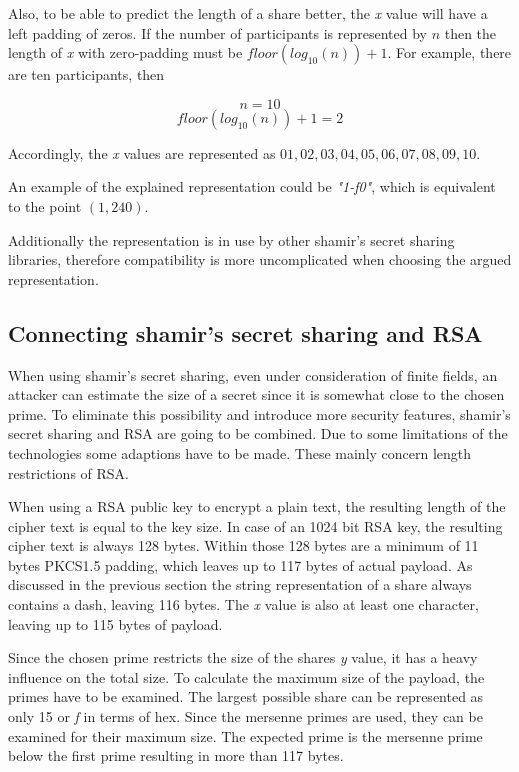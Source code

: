 Also, to be able to predict the length of a share better, the \textit{x} value
will have a left padding of zeros. If the number of participants is represented
by $n$ then the length of \textit{x} with zero-padding must be
$floor(log_{10}(n))+1$. For example, there are ten participants, then

$$n = 10$$
$$floor(log_{10}(n))+1 = 2$$

Accordingly, the \textit{x} values are represented as $01, 02, 03, 04, 05, 06,
07, 08, 09, 10$.

An example of the explained representation could be \textit{"1-f0"}, which is
equivalent to the point $(1, 240)$.

Additionally the representation is in use by other shamir's secret sharing
libraries, therefore compatibility is more uncomplicated when choosing the
argued representation.

\subsection{Connecting shamir's secret sharing and RSA}

When using shamir's secret sharing, even under consideration of finite fields,
an attacker can estimate the size of a secret since it is somewhat close to the
chosen prime. To eliminate this possibility and introduce more security
features, shamir's secret sharing and RSA are going to be combined. Due to some
limitations of the technologies some adaptions have to be made. These mainly
concern length restrictions of RSA.

When using a RSA public key to encrypt a plain text, the resulting length of
the cipher text is equal to the key size. In case of an 1024 bit RSA key, the
resulting cipher text is always 128 bytes. Within those 128 bytes are a minimum
of 11 bytes PKCS1.5 padding, which leaves up to 117 bytes of actual payload. As
discussed in the previous section the string representation of a share always
contains a dash, leaving 116 bytes. The \textit{x} value is also at least one
character, leaving up to 115 bytes of payload.

Since the chosen prime restricts the size of the shares \textit{y} value, it
has a heavy influence on the total size. To calculate the maximum size of the
payload, the primes have to be examined. The largest possible share can be
represented as only 15 or \textit{f} in terms of hex. Since the mersenne primes
are used, they can be examined for their maximum size. The expected prime is
the mersenne prime below the first prime resulting in more than 117 bytes.

